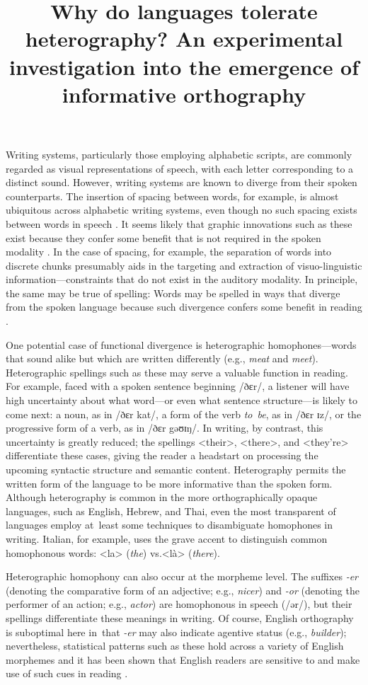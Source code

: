 \documentclass[doc,biblatex]{apa7}
\title{Why do languages tolerate heterography? An experimental investigation into the emergence of informative orthography}
\begin{document}
\maketitle

\noindent
Writing systems, particularly those employing alphabetic scripts, are commonly regarded as visual representations of speech, with each letter corresponding to a distinct sound. However, writing systems are known to diverge from their spoken counterparts. The insertion of spacing between words, for example, is almost ubiquitous across alphabetic writing systems, even though no such spacing exists between words in speech \parencite{Parkes:1992, Saenger:1997}. It seems likely that graphic innovations such as these exist because they confer some benefit that is not required in the spoken modality \parencite{Rastle:2019}. In the case of spacing, for example, the separation of words into discrete chunks presumably aids in the targeting and extraction of visuo-linguistic information---constraints that do not exist in the auditory modality. In principle, the same may be true of spelling: Words may be spelled in ways that diverge from the spoken language because such divergence confers some benefit in reading \parencite{Ulicheva:2020}.

One potential case of functional divergence is heterographic homophones---words that sound alike but which are written differently (e.g., \textit{meat} and \textit{meet}). Heterographic spellings such as these may serve a valuable function in reading. For example, faced with a spoken sentence beginning /ðɛr/, a listener will have high uncertainty about what word---or even what sentence structure---is likely to come next: a noun, as in /ðɛr kat/, a form of the verb \textit{to~be}, as in /ðɛr ɪz/, or the progressive form of a verb, as in /ðɛr gəʊɪŋ/. In writing, by contrast, this uncertainty is greatly reduced; the spellings <their>, <there>, and <they're> differentiate these cases, giving the reader a headstart on processing the upcoming syntactic structure and semantic content. Heterography permits the written form of the language to be more informative than the spoken form. Although heterography is common in the more orthographically opaque languages, such as English, Hebrew, and Thai, even the most transparent of languages employ at~least some techniques to disambiguate homophones in writing. Italian, for example, uses the grave accent to distinguish common homophonous words: <la> (\textit{the}) vs.\@ <là> (\textit{there}).

Heterographic homophony can also occur at the morpheme level. The suffixes \textit{-er} (denoting the comparative form of an adjective; e.g., \textit{nicer}) and \textit{-or} (denoting the performer of an action; e.g., \textit{actor}) are homophonous in speech (/ər/), but their spellings differentiate these meanings in writing. Of course, English orthography is suboptimal here in~that \textit{-er} may also indicate agentive status (e.g., \textit{builder}); nevertheless, statistical patterns such as these hold across a variety of English morphemes \parencite{Berg:2017} and it has been shown that English readers are sensitive to and make use of such cues in reading \parencite{Ulicheva:2020}.
\end{document}
